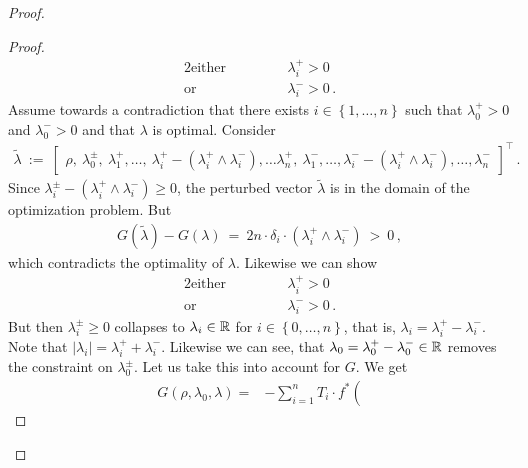 \begin{proof}
\begin{proof}
\begin{alignat*}{2}
  \text{either}
  &
  &&
  \qquad
      \lambda_i^+ > 0
  \\
  \text{or}
  &
  &&
  \qquad
      \lambda_i^- > 0
  \,.
\end{alignat*}
Assume towards a contradiction that 
there exists
$i \in \left\{ 1,\ldots,n \right\}$
such that
$
      \lambda_0^+ > 0
$
and
$
      \lambda_0^- > 0
$ 
and that 
$\lambda$ is optimal.
Consider
  \begin{gather}
    \tilde{\lambda}
    \ 
    :=
    \ 
    \begin{bmatrix}
      \rho
      ,
      \ 
      \lambda_0^\pm,
      \ 
      \lambda_1^+,
      \ldots,
      \ 
      \lambda_i^+
      \!
      -
      (
      \lambda_i^+
      \!
      \land
      \lambda_i^-
      ),
      \ldots
      \lambda_n^+,
      \ 
      \lambda_1^-,
      \ldots,
      \lambda_i^-
      \!
      -
      (
      \lambda_i^+
      \!
      \land
      \lambda_i^-
      ),
      \ldots,
      \lambda_n^-
    \end{bmatrix}
    ^\top
    \,.
  \end{gather}
  Since 
  $
      \lambda_i^\pm
      -
      (
      \lambda_i^+
      \!
      \land
      \lambda_i^-
      )
      \ge 
      0
  $,
  the perturbed vector $\tilde{\lambda}$ is in the domain of the 
  optimization problem.
  But 
  \begin{align}
  G(\tilde{\lambda})
  -
  G(\lambda)
  \ 
  =
  \ 
  2
  n
  \cdot
  \delta_i
  \cdot
      (
      \lambda_i^+
      \!
      \land
      \lambda_i^-
      )
  \ 
  >
  \ 
  0
  \,,
  \end{align}
  which contradicts the optimality of $\lambda$.
  Likewise we can show
\begin{alignat*}{2}
  \text{either}
  &
  &&
  \qquad
      \lambda_i^+ > 0
  \\
  \text{or}
  &
  &&
  \qquad
      \lambda_i^- > 0
  \,.
\end{alignat*}
But then 
$
\lambda^\pm_i
\ge 0
$
collapses to
$
\lambda_i\in \mathbb{R}
$ 
for 
$i\in \left\{ 0,\ldots,n \right\}$, that is,
$ \lambda_i=\lambda_i^+\!-\lambda_i^- $.
Note that
$ |\lambda_i|=\lambda_i^+\!+\lambda_i^- $.
Likewise we can see, that 
$
\lambda_0
=
\lambda_0^+
-
\lambda_0^-
\in \mathbb{R}
$
removes the constraint on $\lambda_0^\pm$.
Let us take this into account for $G$. We get
  \begin{align*}
    G
    (
    \rho,
    \lambda_0,
    \lambda
    )
    =
  &-
  \sum_{i=1} 
  ^n
  T_i
  \cdot
  f^*
  \left( 

\end{align*}
\end{proof}
\end{proof}
